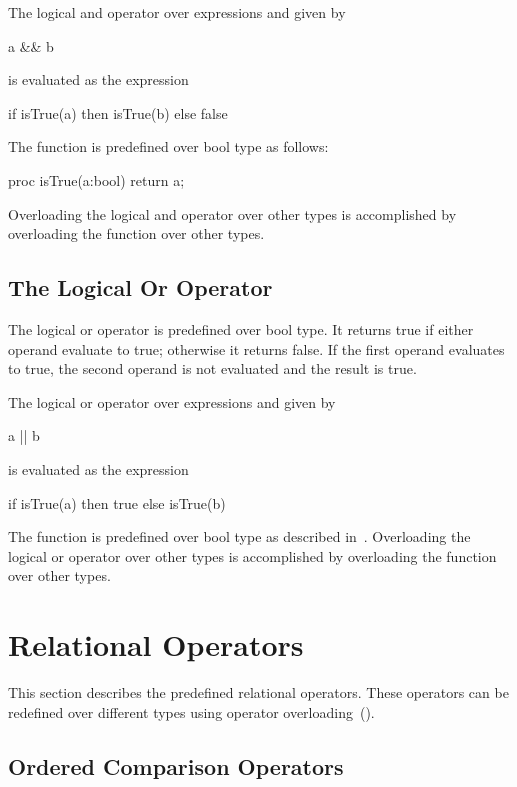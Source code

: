 The logical and operator over expressions  and  given
by
\begin{chapel}
a && b
\end{chapel}
is evaluated as the expression
\begin{chapel}
if isTrue(a) then isTrue(b) else false
\end{chapel}

The function  is predefined over bool type as follows:
\begin{chapel}
proc isTrue(a:bool) return a;
\end{chapel}
Overloading the logical and operator over other types is accomplished
by overloading the  function over other types.

\subsection{The Logical Or Operator}
\label{Logical_Or_Operators}


The logical or operator is predefined over bool type.  It returns
true if either operand evaluate to true; otherwise it returns false.
If the first operand evaluates to true, the second operand is not
evaluated and the result is true.

The logical or operator over expressions  and  given
by
\begin{chapel}
a || b
\end{chapel}
is evaluated as the expression
\begin{chapel}
if isTrue(a) then true else isTrue(b)
\end{chapel}

The function  is predefined over bool type as described
in~.  Overloading the logical or operator
over other types is accomplished by overloading the 
function over other types.

\section{Relational Operators}
\label{Relational_Operators}

This section describes the predefined relational operators.  These
operators can be redefined over different types using operator
overloading~().

\subsection{Ordered Comparison Operators}
\label{Ordered_Comparison_Operators}

